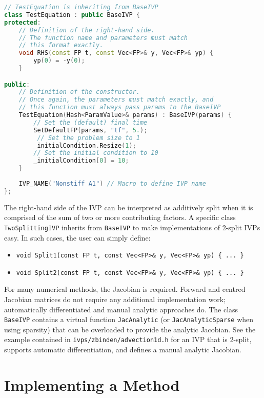 \documentclass[11pt]{article}
\begin{document}
\begin{lstlisting}[tabsize=4,language=c++]
// TestEquation is inheriting from BaseIVP
class TestEquation : public BaseIVP {	
protected: 
	// Definition of the right-hand side.
	// The function name and parameters must match
	// this format exactly.
	void RHS(const FP t, const Vec<FP>& y, Vec<FP>& yp) {
		yp(0) = -y(0);
	}

public:
	// Definition of the constructor.
	// Once again, the parameters must match exactly, and
	// this function must always pass params to the BaseIVP
	TestEquation(Hash<ParamValue>& params) : BaseIVP(params) {
		// Set the (default) final time
		SetDefaultFP(params, "tf", 5.);
		 // Set the problem size to 1
		_initialCondition.Resize(1);
		// Set the initial condition to 10
		_initialCondition[0] = 10;
	}
	
	IVP_NAME("Nonstiff A1") // Macro to define IVP name
};
\end{lstlisting}

The right-hand side of the IVP can be interpreted as additively split when it is comprised of the sum of two or more contributing factors. A specific class \verb=TwoSplittingIVP= inherits from \verb=BaseIVP= to make implementations of 2-split IVPs easy. In such cases, the user can simply define:
\begin{itemize}
\item \verb=void Split1(const FP t, const Vec<FP>& y, Vec<FP>& yp) { ... }=
\item \verb=void Split2(const FP t, const Vec<FP>& y, Vec<FP>& yp) { ... }=
\end{itemize}

For many numerical methods, the Jacobian is required. Forward and centred Jacobian matrices do not require any additional implementation work; automatically differentiated and manual analytic approaches do. The class \verb=BaseIVP= contains a virtual function \verb=JacAnalytic= (or \verb=JacAnalyticSparse= when using sparsity) that can be overloaded to provide the analytic Jacobian. See the example contained in \verb=ivps/zbinden/advection1d.h= for an IVP that is 2-split, supports automatic differentiation, and defines a manual analytic Jacobian.

\section{Implementing a Method}
\end{document}
